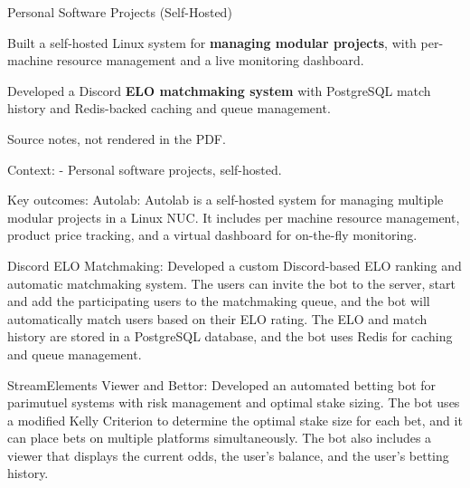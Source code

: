 

\begin{cventries}

  \cventry
    {} %
    {Personal Software Projects (Self-Hosted)} %
    {} %
    {} %
    {
      \begin{cvitems} %
        \item {Built a self-hosted Linux system for \textbf{managing modular projects}, with per-machine resource management and a live monitoring dashboard.}
        \item {Developed a Discord \textbf{ELO matchmaking system} with PostgreSQL match history and Redis-backed caching and queue management.}
      \end{cvitems}
    }
    {
    Source notes, not rendered in the PDF.

    Context:
    - Personal software projects, self-hosted.

    Key outcomes:
      Autolab:
        Autolab is a self-hosted system for managing multiple modular projects in a Linux NUC.
        It includes per machine resource management, product price tracking, and a virtual dashboard for on-the-fly monitoring.

        Discord ELO Matchmaking:
          Developed a custom Discord-based ELO ranking and automatic matchmaking system.
          The users can invite the bot to the server, start and add the participating users to the matchmaking queue, and the bot will automatically match users based on their ELO rating.
          The ELO and match history are stored in a PostgreSQL database, and the bot uses Redis for caching and queue management.

        StreamElements Viewer and Bettor:
          Developed an automated betting bot for parimutuel systems with risk management and optimal stake sizing.
          The bot uses a modified Kelly Criterion to determine the optimal stake size for each bet, and it can place bets on multiple platforms simultaneously.
          The bot also includes a viewer that displays the current odds, the user's balance, and the user's betting history.

}
\end{cventries}
